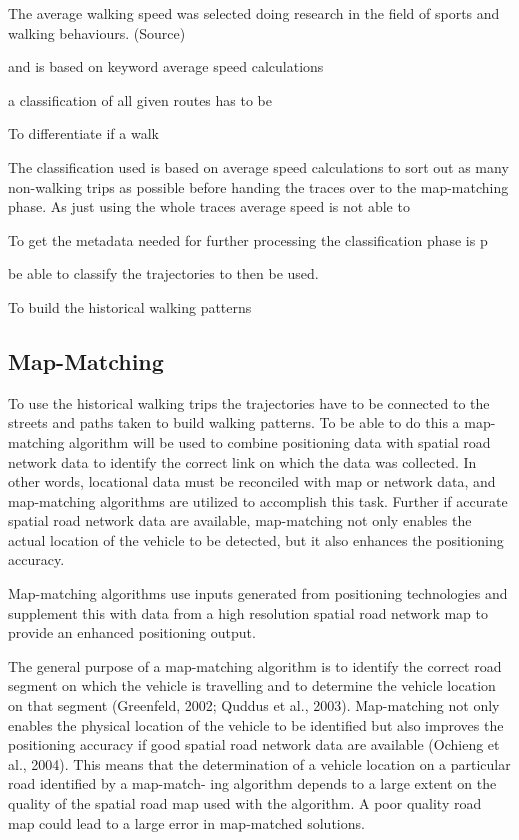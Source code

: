 The average walking speed was selected doing research in the field of sports and walking behaviours. (Source)

and is based on keyword  average speed calculations


a classification of all given routes has to be  

To differentiate if a walk 

The classification used is based on average speed calculations to sort out as many non-walking trips as possible before handing the traces over to the map-matching phase. As just using the whole traces average speed is not able to 

To get the metadata needed for further processing the classification phase is p 


be able to classify the trajectories to then be used. 

To build the historical walking patterns 


\subsection{Map-Matching}

To use the historical walking trips the trajectories have to be connected to the streets and paths taken to build walking patterns. To be able to do this a map-matching algorithm will be used to combine positioning data with spatial road network data to identify the correct link on which the data was collected. \autocite[]{Quddus2007} In other words, locational data must be reconciled with map or network data, and map-matching algorithms are utilized to accomplish this task. \autocite[]{Greenfeld2002} Further if accurate spatial road network data are available, map-matching not only enables the actual location of the vehicle to be detected, but it also enhances the positioning accuracy. \autocite[]{Ochieng2003}


Map-matching algorithms use inputs generated from positioning technologies and supplement this with data from a high resolution spatial road network map to provide an enhanced positioning output. 

The general purpose of a map-matching algorithm is to identify the correct road segment on which the vehicle is travelling and to determine the vehicle location on that segment (Greenfeld, 2002; Quddus et al., 2003). Map-matching not only enables the physical location of the vehicle to be identified but also improves the positioning accuracy if good spatial road network data are available (Ochieng et al., 2004). This means that the determination of a vehicle location on a particular road identified by a map-match- ing algorithm depends to a large extent on the quality of the spatial road map used with the algorithm. A poor quality road map could lead to a large error in map-matched solutions.




